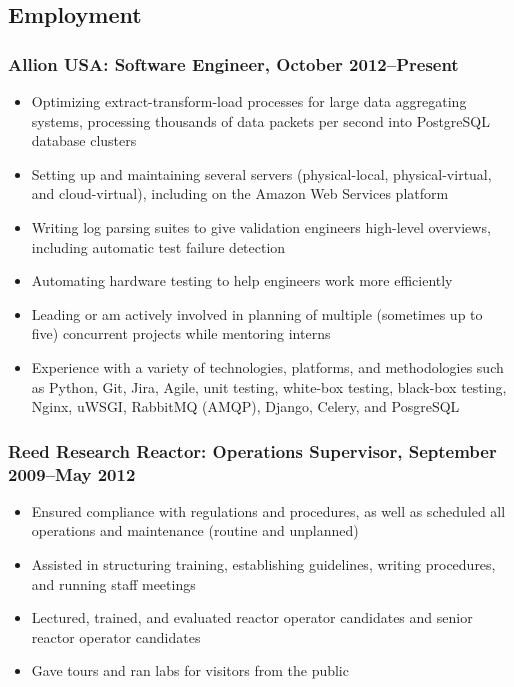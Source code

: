 \documentclass[letterpaper]{article}
\begin{document}
\subsection*{Employment}%


\subsubsection*{Allion USA: \textbf{Software Engineer}, October 2012--Present}
	\begin{itemize}
        \item Optimizing extract-transform-load processes for large data aggregating systems, processing thousands of data packets per second into PostgreSQL database clusters
        \item Setting up and maintaining several servers (physical-local, physical-virtual, and cloud-virtual), including on the Amazon Web Services platform%
        \item Writing log parsing suites to give validation engineers high-level overviews, including automatic test failure detection
        \item Automating hardware testing to help engineers work more efficiently 
        \item Leading or am actively involved in planning of multiple (sometimes up to five) concurrent projects while mentoring interns
        \item Experience with a variety of technologies, platforms, and methodologies such as Python, Git, Jira, Agile, unit testing, white-box testing, black-box testing, Nginx, uWSGI, RabbitMQ (AMQP), Django, Celery, and PosgreSQL 
	\end{itemize}
\subsubsection*{Reed Research Reactor: \textbf{Operations Supervisor}, September 2009--May 2012}
	\begin{itemize}
	   \item Ensured compliance with regulations and procedures, as well as scheduled all operations and maintenance (routine and unplanned)
	   \item Assisted in structuring training, establishing guidelines, writing procedures, and running staff meetings
	   \item Lectured, trained, and evaluated reactor operator candidates and senior reactor operator candidates
	   \item Gave tours and ran labs for visitors from the public
	\end{itemize}
\end{document}

